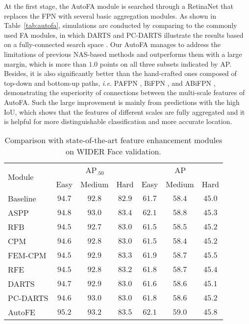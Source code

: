 \documentclass[sigconf]{acmart}
\begin{document}
At the first stage, the AutoFA module is searched through a RetinaNet that replaces the FPN with several basic aggregation modules. 
As shown in Table~\ref{tab:autofa}, simulations are conducted by comparing to the commonly used FA modules, in which DARTS \cite{liu2018darts} and PC-DARTS \cite{xu2019pcdarts} illustrate the results based on a fully-connected search space \cite{wang2019nasfcos}. Our AutoFA manages to address the limitations of previous NAS-based methods and outperforms them with a large margin, which is more than $1.0$ points on all three subsets indicated by AP. 
Besides, it is also significantly better than the hand-crafted ones composed of top-down and bottom-up paths, \textit{i.e.} PAFPN \cite{liu2018pafpn}, BiFPN \cite{tan2020efficientdet}, and ABiFPN \cite{zhang2020acfd}, demonstrating the superiority of connections between the multi-scale features of AutoFA.
Such the large improvement is mainly from predictions with the high IoU, which shows that the features of different scales are fully aggregated and it is helpful for more distinguishable classification and more accurate location.

\begin{table}[!t]
    \centering
    \begin{tabular}{l|ccc|ccc}
        \toprule[1pt]
        \multirow{2}{*}{Module} & \multicolumn{3}{c|}{AP$_{.50}$} & \multicolumn{3}{c}{AP} \\
        \cline{2-7}
        & Easy & Medium & Hard & Easy & Medium & Hard \\
        \midrule[0.5pt]
        Baseline & $94.7$ & $92.8$ & $82.9$ & $61.7$ & $58.4$ & $45.0$ \\
        ASPP & $94.8$ & $93.0$ & $83.4$ & $62.1$ & $58.8$ & $45.3$ \\
        RFB & $94.5$ & $92.7$ & $83.0$ & $61.5$ & $58.5$ & $45.2$ \\
        CPM & $94.6$ & $92.8$ & $83.0$ & $61.5$ & $58.4$ & $45.2$ \\
        FEM-CPM & $94.5$ & $92.9$ & $83.3$ & $61.9$ & $58.7$ & $45.5$ \\
        RFE & $94.5$ & $92.8$ & $83.2$ & $61.8$ & $58.7$ & $45.4$ \\
        DARTS & $94.7$ & $92.9$ & $83.0$ & $61.6$ & $58.6$ & $45.1$ \\
        PC-DARTS & $94.6$ & $93.0$ & $83.0$ & $61.8$ & $58.6$ & $45.2$ \\
        \bottomrule[0.5pt]
        AutoFE & $\mathbf{95.2}$ & $\mathbf{93.2}$ & $\mathbf{83.5}$ & $\mathbf{62.1}$ & $\mathbf{59.0}$ & $\mathbf{45.8}$ \\
        \bottomrule[1pt]
    \end{tabular}
    \caption{Comparison with state-of-the-art feature enhancement modules on WIDER Face validation.}
    \label{tab:autofe}
\end{table}
\end{document}
